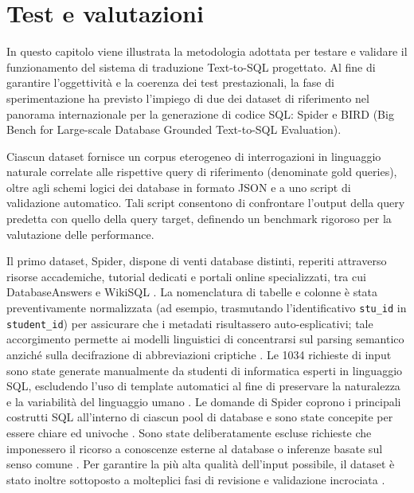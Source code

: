 \chapter{Test e valutazioni}\label{test-e-valutazioni}

In questo capitolo viene illustrata la metodologia adottata per testare
e validare il funzionamento del sistema di traduzione Text-to-SQL
progettato. Al fine di garantire l'oggettività e la coerenza dei test
prestazionali, la fase di sperimentazione ha previsto l'impiego di due
dei dataset di riferimento nel panorama internazionale per la
generazione di codice SQL: Spider e BIRD (Big
Bench for Large-scale Database Grounded Text-to-SQL Evaluation).

Ciascun dataset fornisce un corpus eterogeneo di interrogazioni in
linguaggio naturale correlate alle rispettive query di riferimento
(denominate gold queries), oltre agli schemi logici dei database
in formato JSON e a uno script di validazione automatico. Tali script
consentono di confrontare l'output della query predetta con quello della
query target, definendo un benchmark rigoroso per la valutazione delle
performance.

Il primo dataset, Spider, dispone di venti database distinti, reperiti
attraverso risorse accademiche, tutorial dedicati e portali online
specializzati, tra cui DatabaseAnswers e WikiSQL \cite{yu2019spiderlargescalehumanlabeleddataset}. La nomenclatura di
tabelle e colonne è stata preventivamente normalizzata (ad esempio,
trasmutando l'identificativo \texttt{stu\_id} in \texttt{student\_id})
per assicurare che i metadati risultassero auto-esplicativi; tale
accorgimento permette ai modelli linguistici di concentrarsi sul parsing
semantico anziché sulla decifrazione di abbreviazioni criptiche \cite{yu2019spiderlargescalehumanlabeleddataset}. Le 1034
richieste di input sono state generate manualmente da studenti di
informatica esperti in linguaggio SQL, escludendo l'uso di template
automatici al fine di preservare la naturalezza e la variabilità del
linguaggio umano \cite{yu2019spiderlargescalehumanlabeleddataset}. Le domande di Spider coprono i principali costrutti
SQL all'interno di ciascun pool di database e sono state concepite per
essere chiare ed univoche \cite{yu2019spiderlargescalehumanlabeleddataset}. Sono state deliberatamente escluse richieste
che imponessero il ricorso a conoscenze esterne al database o inferenze
basate sul senso comune \cite{yu2019spiderlargescalehumanlabeleddataset}. Per garantire la più alta qualità dell'input possibile, il
dataset è stato inoltre sottoposto a molteplici fasi di revisione e
validazione incrociata \cite{yu2019spiderlargescalehumanlabeleddataset}.


